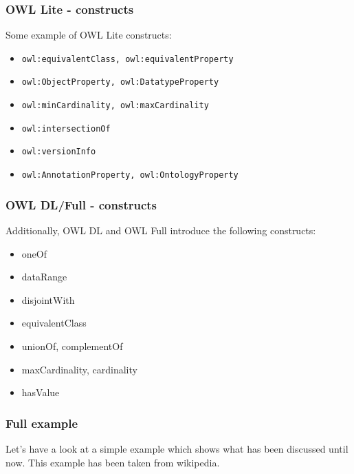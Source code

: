 \documentclass{beamer}
\begin{document}
       \begin{frame}
           \frametitle{OWL Lite - constructs}

           Some example of OWL Lite constructs:
           \vskip 0.7cm
           \begin{itemize}
               \item \texttt{owl:equivalentClass, owl:equivalentProperty}
               \item \texttt{owl:ObjectProperty, owl:DatatypeProperty}
               \item \texttt{owl:minCardinality, owl:maxCardinality}
               \item \texttt{owl:intersectionOf}
               \item \texttt{owl:versionInfo}
               \item \texttt{owl:AnnotationProperty, owl:OntologyProperty}
           \end{itemize}
       \end{frame}

       \begin{frame}
           \frametitle{OWL DL/Full - constructs}

           Additionally, OWL DL and OWL Full introduce the following constructs:
           \vskip 0.7cm
           \begin{itemize}           
               \item oneOf
               \item dataRange
               \item disjointWith
               \item equivalentClass
               \item unionOf, complementOf
               \item maxCardinality, cardinality
               \item hasValue
           \end{itemize}
       \end{frame}

       \begin{frame}
           \frametitle{Full example}

           Let's have a look at a simple example which shows what has been discussed
           until now.
           \vskip 0.3cm
           This example has been taken from wikipedia.

       \end{frame}
\end{document}
